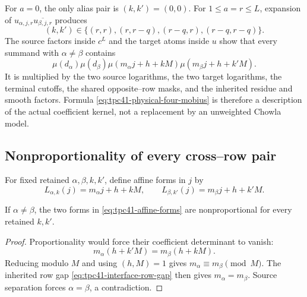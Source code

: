 For \(a=0\), the only alias pair is \((k,k')=(0,0)\).  For
\(1\le a=r\le L\), expansion of
\(u_{\alpha,j,r}\overline{u_{\beta,j,r}}\) produces
\begin{equation}
 (k,k')\in
 \{(r,r),(r,r-q),(r-q,r),(r-q,r-q)\}.
 \label{eq:tpc41-physical-alias-pairs}
\end{equation}
The source factors inside \(c^L\) and the target atoms inside \(u\) show
that every summand with \(\alpha\ne\beta\) contains
\begin{equation}
 \boxed{
 \mu(d_\alpha)\mu(d_\beta)
 \mu(m_\alpha j+h+kM)
 \mu(m_\beta j+h+k'M).}
 \label{eq:tpc41-physical-four-mobius}
\end{equation}
It is multiplied by the two source logarithms, the two target logarithms,
the terminal cutoffs, the shared opposite--row masks, and the inherited
residue and smooth factors.  Formula
\eqref{eq:tpc41-physical-four-mobius} is therefore a description of the
actual coefficient kernel, not a replacement by an unweighted Chowla
model.

\subsection{Nonproportionality of every cross--row pair}

For fixed retained \(\alpha,\beta,k,k'\), define affine forms in \(j\) by
\begin{equation}
 L_{\alpha,k}(j)=m_\alpha j+h+kM,
 \qquad
 L_{\beta,k'}(j)=m_\beta j+h+k'M.
 \label{eq:tpc41-affine-forms}
\end{equation}

\begin{lemma}
\label{lem:tpc41-affine-nonproportional}
If \(\alpha\ne\beta\), the two forms in
\eqref{eq:tpc41-affine-forms} are nonproportional for every retained
\(k,k'\).
\end{lemma}

\begin{proof}
Proportionality would force their coefficient determinant to vanish:
\begin{equation}
 m_\alpha(h+k'M)=m_\beta(h+kM).
 \label{eq:tpc41-affine-determinant-zero}
\end{equation}
Reducing modulo \(M\) and using \((h,M)=1\) gives
\(m_\alpha\equiv m_\beta\pmod M\).  The inherited row gap
\eqref{eq:tpc41-interface-row-gap} then gives
\(m_\alpha=m_\beta\).  Source separation forces
\(\alpha=\beta\), a contradiction.
\end{proof}


